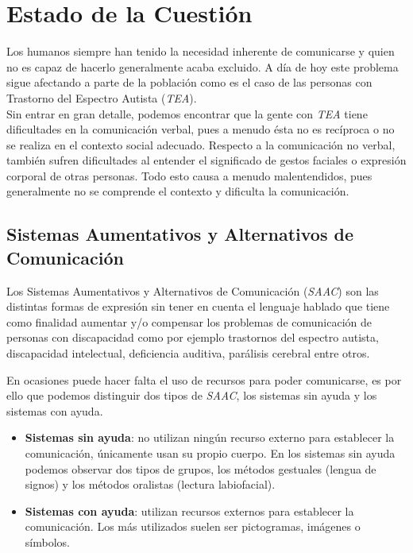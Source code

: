 \chapter{Estado de la Cuestión}
\label{cap:estadoDeLaCuestion}


Los humanos siempre  han tenido la necesidad inherente de comunicarse y quien no es capaz de hacerlo generalmente acaba excluido. A día de hoy este problema sigue afectando a parte de la población como es el caso de las personas con Trastorno del Espectro Autista (\textit{TEA}).
\\

Sin entrar en gran detalle, podemos encontrar que la gente con \textit{TEA} tiene dificultades en la comunicación verbal, pues a menudo ésta no es recíproca o no se realiza en el contexto social adecuado. Respecto a la comunicación no verbal, también sufren dificultades al entender el significado de gestos faciales o expresión corporal de otras personas. Todo esto causa a menudo malentendidos, pues generalmente no se comprende el contexto y dificulta la comunicación. 


\section{Sistemas Aumentativos y Alternativos de Comunicación}
Los Sistemas Aumentativos y Alternativos de Comunicación (\textit{SAAC}) son las distintas formas de expresión sin tener en cuenta el lenguaje hablado que tiene como finalidad aumentar y/o compensar los problemas de comunicación de personas con discapacidad como por ejemplo trastornos del espectro autista, discapacidad intelectual, deficiencia auditiva, parálisis cerebral entre otros.

En ocasiones puede hacer falta el uso de recursos para poder comunicarse, es por ello que podemos distinguir dos tipos de \textit{SAAC}, los sistemas sin ayuda y los sistemas con ayuda.
\newpage
\begin{itemize}
	\item \textbf{Sistemas sin ayuda}: no utilizan ningún recurso externo para establecer la comunicación, únicamente usan su propio cuerpo. En los sistemas sin ayuda podemos observar dos tipos de grupos, los métodos gestuales (lengua de signos) y los métodos oralistas (lectura labiofacial). 
	\item \textbf{Sistemas con ayuda}: utilizan recursos externos para establecer la comunicación. Los más utilizados suelen ser pictogramas, imágenes o símbolos.
\end{itemize}

